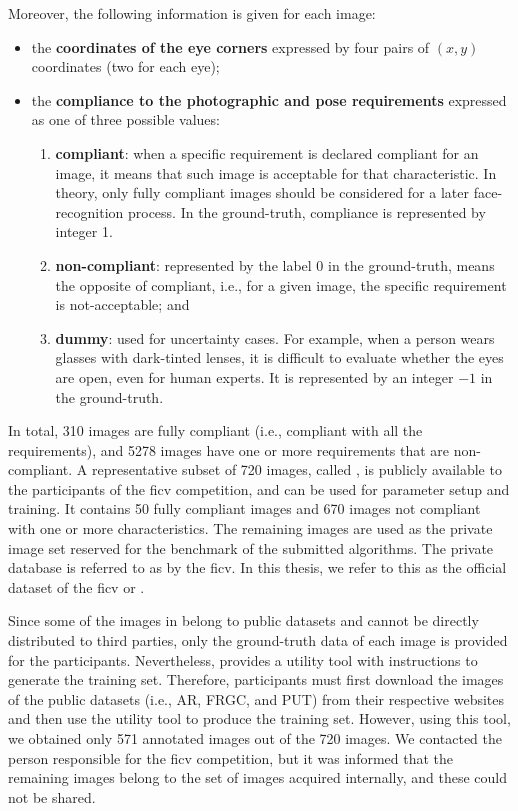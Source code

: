 Moreover, the following information is given for each image:
 
\begin{itemize}
\item the \textbf{coordinates of the eye corners} expressed by four pairs of $(x, y)$ coordinates (two for each eye);
\item the \textbf{compliance to the photographic and pose requirements} expressed as one of three possible values: 
 \begin{enumerate}[i]
 \item \textbf{compliant}: when a specific requirement is declared compliant for an image, it means that such image is acceptable for that characteristic. In theory, only fully compliant images should be considered for a later face-recognition process. In the ground-truth, compliance is represented by integer 1.
 \item \textbf{non-compliant}: represented by the label 0 in the ground-truth, means the opposite of compliant, i.e., for a given image, the specific requirement is not-acceptable; and
 \item \textbf{dummy}: used for uncertainty cases. For example, when a person wears glasses with dark-tinted lenses, it is difficult to evaluate whether the eyes are open, even for human experts. It is represented by an integer $-1$ in the ground-truth.
 \end{enumerate}
\end{itemize}
 
In total, 310 images are fully compliant (i.e., compliant with all the requirements), and 5278 images have one or more requirements that are non-compliant. A representative subset of 720 images, called \ficvtest, is publicly available to the participants of the \acs{ficv} competition, and can be used for parameter setup and training. It contains 50 fully compliant images and 670 images not compliant with one or more characteristics. The remaining images are used as the private image set reserved for the benchmark of the submitted algorithms. The private database is referred to as \ficvofficial by the \acs{ficv}. In this thesis, we refer to this as the official dataset of the \acs{ficv} or \fvcongoing. 
 
Since some of the images in \ficvtest belong to public datasets and cannot be directly distributed to third parties, only the ground-truth data of each image is provided for the participants. Nevertheless, \fvcongoing provides a utility tool with instructions to generate the training set. Therefore, participants must first download the images of the public datasets (i.e., AR, FRGC, and PUT) from their respective websites and then use the utility tool to produce the training set. However, using this tool, we obtained only 571 annotated images out of the 720 images. We contacted the person responsible for the \acs{ficv} competition, but it was informed that the remaining images belong to the set of images acquired internally, and these could not be shared.
 
